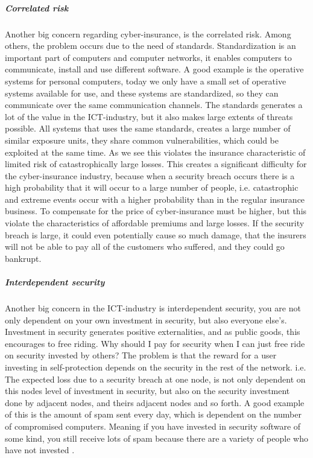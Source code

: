       
\subparagraph{Correlated risk}

Another big concern regarding cyber-insurance, is the correlated risk. Among others, the problem occurs due to the need of standards. Standardization is an important part of computers and computer networks, it enables computers to communicate, install and use different software. A good example is the operative systems for personal computers, today we only have a small set of operative systems available for use, and these systems are standardized, so they can communicate over the same communication channels. The standards generates a lot of the value in the ICT-industry, but it also makes large extents of threats possible. All systems that uses the same standards, creates a large number of similar exposure units, they share common vulnerabilities, which could be exploited at the same time. As we see this violates the insurance characteristic of limited risk of catastrophically large losses.  
This creates a significant difficulty for the cyber-insurance industry, because when a security breach occurs there is a high probability that it will occur to a large number of people, i.e. catastrophic and extreme events occur with a higher probability than in the regular insurance business. To compensate for the price of cyber-insurance must be higher, but this violate the characteristics of affordable premiums and large losses. 
If the security breach is large, it could even potentially cause so much damage, that the insurers will not be able to pay all of the customers who suffered, and they could go bankrupt.\cite{bohme2010modeling}


\subparagraph{Interdependent security}
Another big concern in the ICT-industry is interdependent security, you are not only dependent on your own investment in security, but also everyone else’s. 
Investment in security generates positive externalities, and as public goods, this encourages to free riding. Why should I pay for security when I can just free ride on security invested by others? The problem is that the reward for a user investing in self-protection depends on the security in the rest of the network. i.e. The expected loss due to a security breach at one node, is not only dependent on this nodes level of investment in security, but also on the security investment done by adjacent nodes, and theirs adjacent nodes and so forth. A good example of this is the amount of spam sent every day, which is dependent on the number of compromised computers. Meaning if you have invested in security software of some kind, you still receive lots of spam because there are a variety of people who have not invested
 \cite{towardsInsurable}.
 
